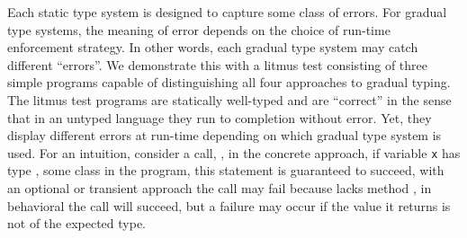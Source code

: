 \documentclass[USenglish]{tex/lipics-v2016}
\newcommand{\code}[1]{{\tt #1}\xspace}
\begin{document}
Each static type system is designed to capture some class of errors. For
gradual type systems, the meaning of error depends on the choice of run-time
enforcement strategy.  In other words, each gradual type system may catch
different ``errors''.  We demonstrate this with a litmus test consisting of
three simple programs capable of distinguishing all four approaches to
gradual typing. The litmus test programs are statically well-typed and are
``correct'' in the sense that in an untyped language they run to completion
without error. Yet, they display different errors at run-time depending on
which gradual type system is used. For an intuition, consider a call,
, in the concrete approach, if variable \code x has type \C,
some class in the program, this statement is guaranteed to succeed, with an
optional or transient approach the call may fail because \x lacks method \m,
in behavioral the call will succeed, but a failure may occur if the value it
returns is not of the expected type.

\begin{figure}\begin{center}
\vspace{-6mm}
\end{center}
\vspace{-7mm}\end{figure}
\end{document}
